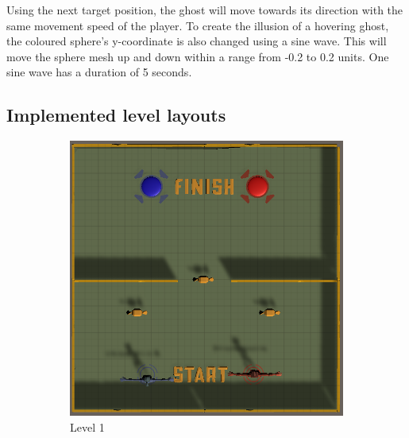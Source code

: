 Using the next target position, the ghost will move towards its direction with the same movement speed of the player. To create the illusion of a hovering ghost, the coloured sphere's y-coordinate is also changed using a sine wave. This will move the sphere mesh up and down within a range from -0.2 to 0.2 units. One sine wave has a duration of 5 seconds.



\newpage
\subsection{Implemented level layouts}
\label{section:level layouts}

\begin{figure}[h!]
    \centering
    \begin{subfigure}[b]{0.45\linewidth}
        \includegraphics[width=\linewidth]{images/level_1.png}
        \caption{Level 1}
        \label{fig:level 1}
      \end{subfigure}
    \begin{subfigure}[b]{0.45\linewidth}

\end{subfigure}
\end{figure}
